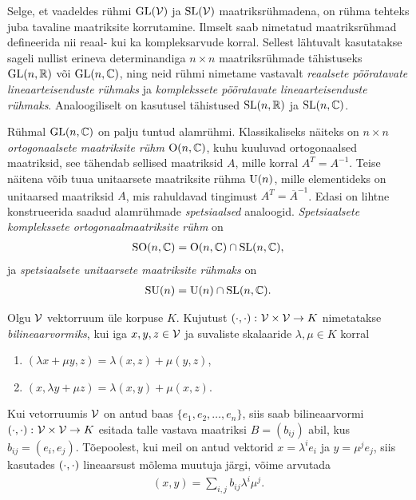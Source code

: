 Selge, et vaadeldes rühmi $\operatorname{GL}(\mathcal{V})$ ja $\operatorname{SL}(\mathcal{V})$ maatriksrühmadena,
on rühma tehteks juba tavaline maatriksite korrutamine. Ilmselt saab
nimetatud maatriksrühmad defineerida nii reaal- kui ka kompleksarvude korral.
Sellest lähtuvalt kasutatakse sageli
nullist erineva determinandiga $n \times n$ maatriksrühmade tähistuseks
$\operatorname{GL}(n, \mathbb{R})$ või $\operatorname{GL}(n, \mathbb{C})$, ning neid rühmi nimetame vastavalt
\emph{reaalsete pööratavate lineaarteisenduste rühmaks} ja \emph{komplekssete
pööratavate lineaarteisenduste rühmaks}. Analoogiliselt on kasutusel
tähistused $\operatorname{SL}(n, \mathbb{R})$ ja $\operatorname{SL}(n, \mathbb{C})$.

Rühmal $\operatorname{GL}(n, \mathbb{C})$ on palju tuntud alamrühmi. Klassikaliseks näiteks on
$n \times n$ \emph{ortogonaalsete maatriksite rühm} $\operatorname{O}(n, \mathbb{C})$, kuhu
kuuluvad ortogonaalsed maatriksid, see tähendab sellised maatriksid $A$, mille
korral $A^T = A^{-1}$. Teise näitena võib tuua unitaarsete maatriksite rühma
$\operatorname{U}(n)$, mille elementideks on unitaarsed maatriksid $A$, mis rahuldavad
tingimust $A^T = \overline{A}^{-1}$. Edasi on lihtne
konstrueerida saadud alamrühmade \emph{spetsiaalsed} analoogid.
\emph{Spetsiaalsete komplekssete ortogonaalmaatriksite rühm} on
\begin{align*}
    \operatorname{SO}(n, \mathbb{C}) = \operatorname{O}(n, \mathbb{C}) \cap \operatorname{SL}(n, \mathbb{C}),
\end{align*}
ja \emph{spetsiaalsete unitaarsete maatriksite rühmaks} on
\begin{align*}
    \operatorname{SU}(n) = \operatorname{U}(n) \cap \operatorname{SL}(n, \mathbb{C}).
\end{align*}

\begin{dfn}
    Olgu $\mathcal{V}$ vektorruum üle korpuse $K$. Kujutust
    $\left( \cdot, \cdot \right) \colon \mathcal{V} \times \mathcal{V} \to K$
    nimetatakse \emph{bilineaarvormiks}, kui iga $x, y, z \in \mathcal{V}$
    ja suvaliste skalaaride $\lambda, \mu \in K$ korral
    \begin{enumerate}[label=\roman*.]
        \item $(\lambda x + \mu y, z) = \lambda (x, z) + \mu (y, z)$,
        \item $(x, \lambda y + \mu z) = \lambda (x, y) + \mu (x, z)$.
    \end{enumerate}
\end{dfn}

Kui vetorruumis $\mathcal{V}$ on antud baas $\{e_1, e_2, \dots, e_n\}$, siis saab
bilineaarvormi $\left( \cdot, \cdot \right) \colon \mathcal{V} \times \mathcal{V} \to K$ esitada talle vastava maatriksi
$B = (b_{ij})$ abil, kus $b_{ij} = (e_i, e_j)$. Tõepoolest, kui
meil on antud vektorid $x = \lambda^i e_i$ ja $y = \mu^j e_j$,
siis kasutades $\left( \cdot, \cdot \right)$ lineaarsust mõlema muutuja järgi, võime arvutada
\begin{align*}
    (x, y) = \sum_{i, j} b_{ij} \lambda^i \mu^j.
\end{align*}

